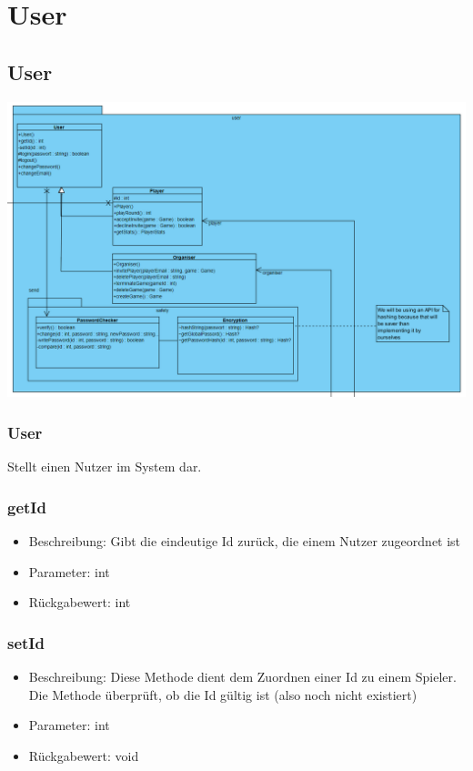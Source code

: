 \documentclass[a4paper]{scrreprt}
\begin{document}
	\section{User}
	\subsection{User}
	\includegraphics[width=\textwidth]{img/user.png}
	\subsubsection{User}
	Stellt einen Nutzer im System dar.
	\subsubsection{getId}
	\begin{itemize}
		\item Beschreibung: Gibt die eindeutige Id zurück, die einem Nutzer zugeordnet ist
		\item Parameter: int
		\item Rückgabewert: int
	\end{itemize}
	\subsubsection{setId}
	\begin{itemize}
		\item Beschreibung: Diese Methode dient dem Zuordnen einer Id zu einem Spieler. Die Methode überprüft, ob die Id gültig ist (also noch nicht existiert)
		\item Parameter: int
		\item Rückgabewert: void
	\end{itemize}
\end{document}
